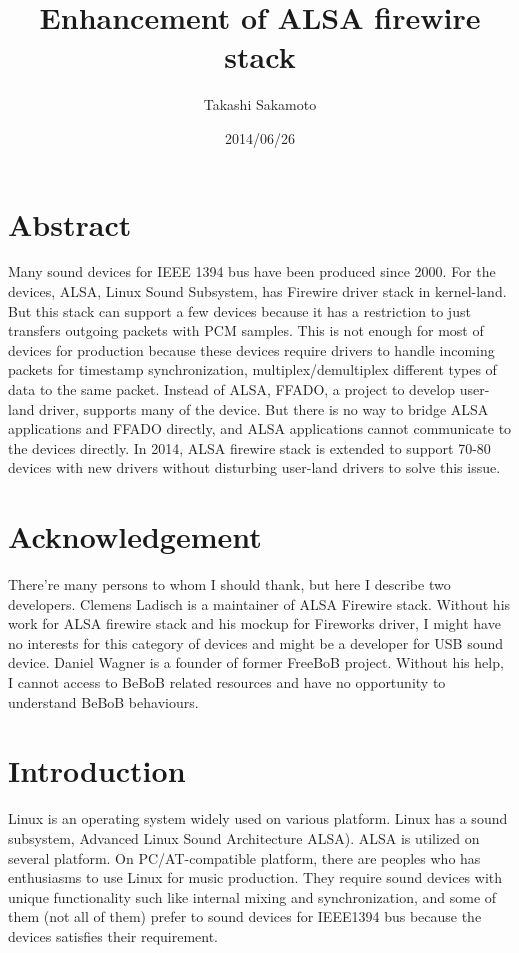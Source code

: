 \documentclass[onecolumn]{article}
\begin{document}
\title{Enhancement of ALSA firewire stack}
\author{Takashi Sakamoto}
\date{2014/06/26}
\maketitle{}

\section{Abstract}

Many sound devices for IEEE 1394 bus have been produced since 2000. For the devices, ALSA, Linux Sound Subsystem, has Firewire driver stack in kernel-land. But this stack can support a few devices because it has a restriction to just transfers outgoing packets with PCM samples. This is not enough for most of devices for production because these devices require drivers to handle incoming packets for timestamp synchronization, multiplex/demultiplex different types of data to the same packet. Instead of ALSA, FFADO, a project to develop user-land driver, supports many of the device. But there is no way to bridge ALSA applications and FFADO directly, and ALSA applications cannot communicate to the devices directly. In 2014, ALSA firewire stack is extended to support 70-80 devices with new drivers without disturbing user-land drivers to solve this issue.


\section{Acknowledgement}

There're many persons to whom I should thank, but here I describe two developers. Clemens Ladisch is a maintainer of ALSA Firewire stack. Without his work for ALSA firewire stack and his mockup for Fireworks driver, I might have no interests for this category of devices and might be a developer for USB sound device. Daniel Wagner is a founder of former FreeBoB project. Without his help, I cannot access to BeBoB related resources and have no opportunity to understand BeBoB behaviours. 


\section{Introduction}

Linux is an operating system widely used on various platform. Linux has a sound subsystem, Advanced Linux Sound Architecture ALSA). ALSA is utilized on several platform. On PC/AT-compatible platform, there are peoples who has enthusiasms to use Linux for music production. They require sound devices with unique functionality such like internal mixing and synchronization, and some of them (not all of them) prefer to sound devices for IEEE1394 bus because the devices satisfies their requirement.
\end{document}
